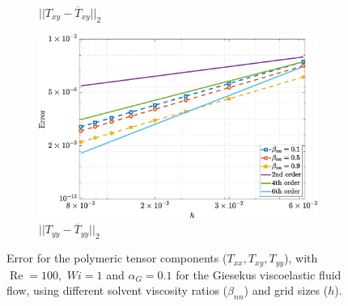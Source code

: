 \documentclass[preprint, 12pt]{elsarticle}
\begin{document}
\begin{figure}[H]
\begin{subfigure}[b]{.46\textwidth}
        \caption{$||T_{xy} - \overline{T}_{xy}||_{2}$}
        \label{error_txy_2nd_Case1_giesekus_alphaG_0.1}
    \end{subfigure}
    \qquad
    \begin{subfigure}[b]{.46\textwidth}
        \includegraphics[width=\textwidth]{NormErr_2nd_Re_100_Wi_1_epsilon_0_xi_0_alphaG_0.1_Dt_1e-06_at_0.05_tipsim_1_MMS_12_Tyy.eps}
        \caption{$||T_{yy} - \overline{T}_{yy}||_{2}$}
        \label{error_tyy_2nd_Case1_giesekus_alphaG_0.1}
    \end{subfigure}
    \vspace{0.02cm}
    \caption{Error for the polymeric tensor components ($T_{xx}, T_{xy}, T_{yy}$), with $\operatorname{Re}=100,$ $Wi=1$ and $\alpha_{G} = 0.1$ for the Giesekus viscoelastic fluid flow, using different solvent viscosity ratios ($\beta_{nn}$) and grid sizes ($h$).\label{fig_Giesekus_error012}}
\end{figure}
\end{document}
